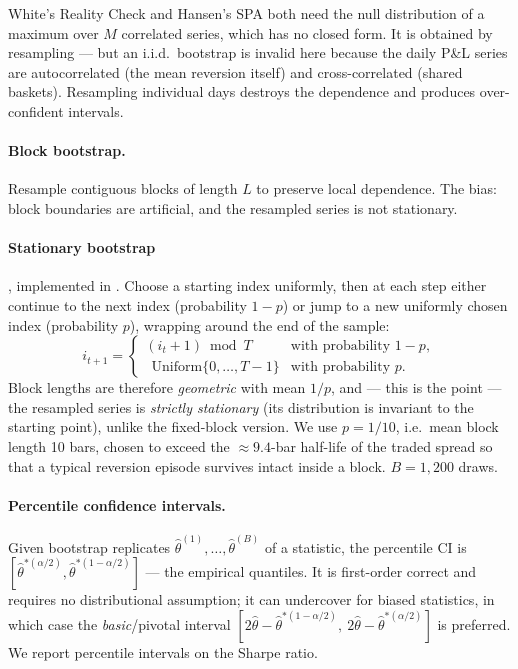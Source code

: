 White's Reality Check and Hansen's SPA both need the null distribution of a maximum over
$M$ correlated series, which has no closed form. It is obtained by resampling --- but an
i.i.d.\ bootstrap is invalid here because the daily P\&L series are autocorrelated
(the mean reversion itself) and cross-correlated (shared baskets). Resampling individual
days destroys the dependence and produces over-confident intervals.

\paragraph{Block bootstrap.} Resample contiguous blocks of length $L$ to preserve local
dependence. The bias: block boundaries are artificial, and the resampled series is not
stationary.

\paragraph{Stationary bootstrap} \cite{politisromano1994}, implemented in
. Choose a starting index uniformly, then at each step
either continue to the next index (probability $1-p$) or jump to a new uniformly chosen
index (probability $p$), wrapping around the end of the sample:
\begin{equation}
  i_{t+1} = \begin{cases} (i_t+1)\bmod T & \text{with probability } 1-p,\\
  \ \ \text{Uniform}\{0,\dots,T-1\} & \text{with probability } p.
  \end{cases}
  \label{eq:stationarybootstrap}
\end{equation}
Block lengths are therefore \emph{geometric} with mean $1/p$, and --- this is the point ---
the resampled series is \emph{strictly stationary} (its distribution is invariant to the
starting point), unlike the fixed-block version. We use $p=1/10$, i.e.\ mean block length
10 bars, chosen to exceed the $\approx9.4$-bar half-life of the traded spread so that a
typical reversion episode survives intact inside a block. $B=1{,}200$ draws.

\paragraph{Percentile confidence intervals.} Given bootstrap replicates
$\hat\theta^{(1)},\dots,\hat\theta^{(B)}$ of a statistic, the percentile CI is
$[\hat\theta^{*(\alpha/2)},\hat\theta^{*(1-\alpha/2)}]$ --- the empirical quantiles. It is
first-order correct and requires no distributional assumption; it can undercover for
biased statistics, in which case the \emph{basic}/pivotal interval
$[2\hat\theta - \hat\theta^{*(1-\alpha/2)},\ 2\hat\theta-\hat\theta^{*(\alpha/2)}]$ is
preferred. We report percentile intervals on the Sharpe ratio.

